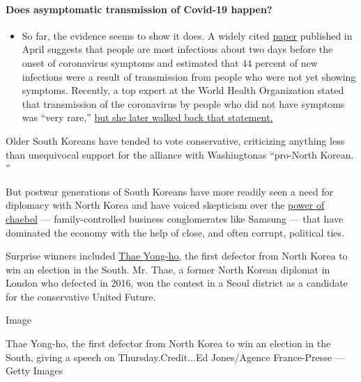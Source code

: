 \begin{itemize}
{  \paragraph{Does asymptomatic transmission of Covid-19
  happen?}\label{does-asymptomatic-transmission-of-covid-19-happen}}

  \begin{itemize}
  \tightlist
  \item
    So far, the evidence seems to show it does. A widely cited
    \href{https://www.nature.com/articles/s41591-020-0869-5}{paper}
    published in April suggests that people are most infectious about
    two days before the onset of coronavirus symptoms and estimated that
    44 percent of new infections were a result of transmission from
    people who were not yet showing symptoms. Recently, a top expert at
    the World Health Organization stated that transmission of the
    coronavirus by people who did not have symptoms was ``very rare,''
    \href{https://www.nytimes3xbfgragh.onion/2020/06/09/world/coronavirus-updates.html?action=click\&pgtype=Article\&state=default\&region=MAIN_CONTENT_3\&context=storylines_faq\#link-1f302e21}{but
    she later walked back that statement.}
  \end{itemize}
\end{itemize}

Older South Koreans have tended to vote conservative, criticizing
anything less than​ unequivocal support for the alliance with Washington
​as ``pro-North Korean.​''​

But postwar generations of South Koreans have more readily seen a need
for diplomacy with North Korea and have voiced skepticism over the
\href{https://www.nytimes3xbfgragh.onion/2017/01/02/world/asia/south-korea-park-geun-hye-samsung.html}{power
of chaebol} --- family-controlled business conglomerates like Samsung
--- that have dominated the economy​ with the help of close, and often
corrupt, political ties​.​

Surprise winners included
\href{https://www.nytimes3xbfgragh.onion/2020/02/19/world/asia/north-korean-defector-parliament.html}{Thae
Yong-ho,} the first defector from North Korea to win an election in the
South. Mr. Thae, a former North Korean diplomat in London who defected
in 2016, won the contest in a Seoul district as a candidate for the
conservative United Future.

Image

Thae Yong-ho, the first defector from North Korea to win an election in
the South, giving a speech on Thursday.Credit...Ed Jones/Agence
France-Presse --- Getty Images

